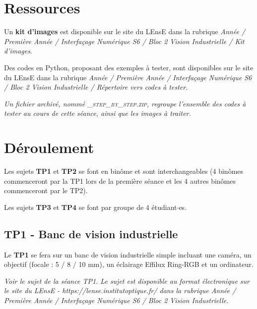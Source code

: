 \documentclass[a4paper,11pt,titlepage]{article} %
\begin{document}
\medskip


\newpage
\section{Ressources}

Un \textbf{kit d'images} est disponible sur le site du LEnsE dans la rubrique  \textit{Année / Première Année / Interfaçage Numérique S6 / Bloc 2 Vision Industrielle / Kit d'images}. 

\medskip

Des {codes en Python}, proposant des exemples à tester, sont disponibles sur le site du LEnsE dans la rubrique \textit{Année / Première Année / Interfaçage Numérique S6 / Bloc 2 Vision Industrielle / Répertoire vers codes à tester}. 

\textit{Un fichier archivé, nommé \textsc{\_step\_by\_step.zip}, regroupe l'ensemble des codes à tester au cours de cette séance, ainsi que les images à traiter.}



\section{Déroulement}

Les sujets \textbf{TP1} et \textbf{TP2} se font en binôme et sont interchangeables (4 binômes commenceront par la TP1 lors de la première séance et les 4 autres binômes commenceront par le TP2).

Les sujets \textbf{TP3} et \textbf{TP4} se font par groupe de 4 étudiant$\cdot$es.


\subsection{TP1 - Banc de vision industrielle}

Le \textbf{TP1} se fera sur un banc de vision industrielle simple incluant une caméra, un objectif (focale : 5 / 8 / 10 mm), un éclairage Effilux Ring-RGB et un ordinateur.

\medskip

\textit{Voir le sujet de la séance TP1. Le sujet est disponible au format électronique sur le site du LEnsE - https://lense.institutoptique.fr/ dans la rubrique Année / Première Année / Interfaçage Numérique S6 / Bloc 2 Vision Industrielle.}
\end{document}
